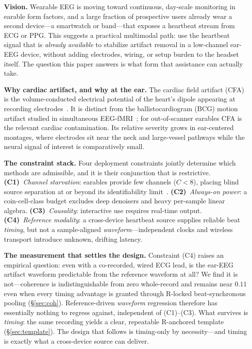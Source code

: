 \documentclass[conference]{IEEEtran}
\begin{document}
\textbf{Vision.} Wearable EEG is moving toward continuous, day-scale monitoring in earable form
factors, and a large fraction of prospective users already wear a second device---a smartwatch or
band---that exposes a heartbeat stream from ECG or PPG. This suggests a practical multimodal path:
use the heartbeat signal that is \emph{already available} to stabilize artifact removal in a
low-channel ear-EEG device, without adding electrodes, wiring, or setup burden to the headset
itself. The question this paper answers is what form that assistance can actually take.

\textbf{Why cardiac artifact, and why at the ear.} The cardiac field artifact (CFA) is the
volume-conducted electrical potential of the heart's dipole appearing at recording
electrodes~\cite{dirlich1997}. It is distinct from the ballistocardiogram (BCG) motion artifact
studied in simultaneous EEG-fMRI~\cite{allen1998,allen2000,niazy2005}; for out-of-scanner earables
CFA is the relevant cardiac contamination. Its relative severity grows in ear-centered montages,
where electrodes sit near the neck and large-vessel pathways while the neural signal of interest is
comparatively small.

\textbf{The constraint stack.} Four deployment constraints jointly determine which methods are
admissible, and it is their conjunction that is restrictive. \textbf{(C1)}~\emph{Channel
starvation}: earables provide few channels ($C<8$), placing blind source separation at or beyond its
identifiability limit~\cite{jung2000,pion2019}. \textbf{(C2)}~\emph{Always-on power}: a
coin-cell-class budget excludes deep denoisers and heavy per-sample linear algebra.
\textbf{(C3)}~\emph{Causality}: interactive use requires real-time output.
\textbf{(C4)}~\emph{Reference modality}: a cross-device heartbeat source supplies reliable beat
\emph{timing}, but not a sample-aligned \emph{waveform}---independent clocks and wireless transport
introduce unknown, drifting latency.

\textbf{The measurement that settles the design.} Constraint (C4) raises an empirical question: even
with a co-recorded, wired ECG lead, is the ear-EEG artifact waveform predictable from the reference
waveform at all? We find it is not---coherence is indistinguishable from zero whole-record and
remains near $0.11$ even when every timing advantage is granted through R-locked beat-synchronous
pooling (\S\ref{sec:coh}). Reference-driven \emph{waveform} regression therefore has essentially
nothing to regress against, independent of (C1)--(C3). What survives is \emph{timing}: the same
recording yields a clear, repeatable R-anchored template (\S\ref{sec:template}). The design that
follows is timing-only by necessity---and timing is exactly what a cross-device source can deliver.
\end{document}
